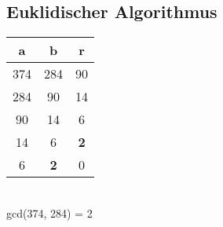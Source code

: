 \documentclass{article}
\begin{document}
\subsection{Euklidischer Algorithmus}

\begin{table}[h]
	\begin{center}
		\begin{tabular}{c|c|c}
			a   & b   & r\\
			\hline
			374 & 284 & 90\\
			284 & 90  & 14\\
			90  & 14  & 6\\
			14  & 6   & \textbf{2}\\
			6   & \textbf{2} & 0\\
		\end{tabular}
		\vspace{1em}\\
		gcd(374, 284) = 2
	\end{center}
\end{table}
\end{document}
